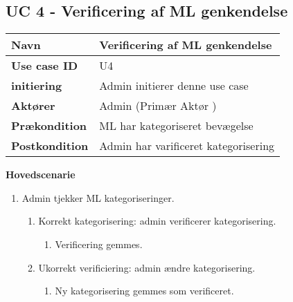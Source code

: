 \subsection{UC 4 - Verificering af ML genkendelse}
\begin{table}[htbp] 
	\begin{tabular}{|p{5cm}|p{9cm}|}
		\hline
		\textbf{Navn} & Verificering af ML genkendelse \\ \hline
		\textbf{Use case ID} & U4 \\ \hline
		\textbf{initiering} & Admin initierer denne use case \\ \hline
		\textbf{Aktører} & Admin (Primær Aktør ) \\ \hline
		\textbf{Prækondition} & ML har kategoriseret bevægelse \\ \hline
		\textbf{Postkondition} & Admin har varificeret kategorisering  \\ \hline
	\end{tabular}
\end{table}
\textbf{Hovedscenarie}
\begin{enumerate}
	\item Admin tjekker ML kategoriseringer.
	\begin{enumerate}
		\item Korrekt kategorisering: admin verificerer kategorisering.
		\begin{enumerate}
			\item Verificering gemmes.
		\end{enumerate}
		\item Ukorrekt verificiering: admin ændre kategorisering.
		\begin{enumerate}
			\item Ny kategorisering gemmes som verificeret.
		\end{enumerate}
	\end{enumerate}
\end{enumerate}

